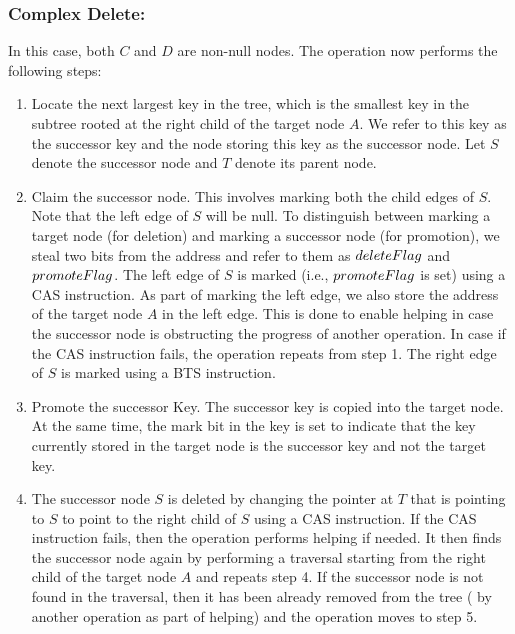 \subsubsection{Complex Delete:} In this case, both $C$ and $D$ are non-null nodes. The operation now performs the following steps:
\begin{enumerate}
\item Locate the next largest key in the tree, which is the smallest key in the subtree rooted at the right child of the target node $A$. We refer to this key as the successor key and the node storing this key as the successor node. Let $S$ denote the successor node and $T$ denote its parent node.
\item Claim the successor node. This involves marking both the child edges of $S$. Note that the left edge of $S$ will be null. To distinguish between marking a target node (for deletion) and marking a successor node (for promotion), we steal two bits from the address and refer to them as $deleteFlag$ and $promoteFlag$. The left edge of $S$ is marked (i.e., $promoteFlag$ is set) using a CAS instruction. As part of marking the left edge, we also store the address of the target node $A$ in the left edge. This is done to enable helping in case the successor node is obstructing the progress of another operation. In case if the CAS instruction fails, the operation repeats from step 1. The right edge of $S$ is marked using a BTS instruction.
\item Promote the successor Key. The successor key is copied into the target node. At the same time, the mark bit in the key is set to indicate that the key currently stored in the target node is the successor key and not the target key.
\item The successor node $S$ is deleted by changing the pointer at $T$ that is pointing to $S$ to point to the right child of $S$ using a CAS instruction. If the CAS instruction fails, then the operation performs helping if needed. It then finds the successor node again by performing a traversal starting from the right child of the target node $A$ and repeats step 4. If the successor node is not found in the traversal, then it has been already removed from the tree ( by another operation as part of helping) and the operation moves to step 5. 

\end{enumerate}
